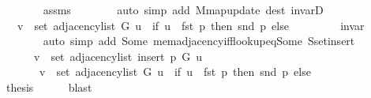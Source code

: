 \begin{isabellebody}
\ \ \ \ \ \ \isamarkupfalse%
\ assms\isanewline
\ \ \ \ \ \ \isamarkupfalse%
\ {\isacharparenleft}{\kern0pt}auto\ simp\ add{\isacharcolon}{\kern0pt}\ M{\isachardot}{\kern0pt}map{\isacharunderscore}{\kern0pt}update\ dest{\isacharcolon}{\kern0pt}\ invarD{\isacharparenleft}{\kern0pt}{}{\isacharparenright}{\kern0pt}{\isacharparenright}{\kern0pt}\isanewline
\ \ \ \ \isamarkupfalse%
\ \isamarkupfalse%
\ {\isachardoublequoteopen}{\isachardot}{\kern0pt}{\isachardot}{\kern0pt}{\isachardot}{\kern0pt}\ {\isasymlongleftrightarrow}\ v\ {\isasymin}\ set\ {\isacharparenleft}{\kern0pt}adjacency{\isacharunderscore}{\kern0pt}list\ G\ u{\isacharparenright}{\kern0pt}\ {\isasymunion}\ {\isacharparenleft}{\kern0pt}if\ u\ {\isacharequal}{\kern0pt}\ fst\ p\ then\ {\isacharbraceleft}{\kern0pt}snd\ p{\isacharbraceright}{\kern0pt}\ else\ {\isacharbraceleft}{\kern0pt}{\isacharbraceright}{\kern0pt}{\isacharparenright}{\kern0pt}{\isachardoublequoteclose}\isanewline
\ \ \ \ \ \ \isamarkupfalse%
\ invar\isanewline
\ \ \ \ \ \ \isamarkupfalse%
\ {\isacharparenleft}{\kern0pt}auto\ simp\ add{\isacharcolon}{\kern0pt}\ Some\ mem{\isacharunderscore}{\kern0pt}adjacency{\isacharunderscore}{\kern0pt}iff{\isacharunderscore}{\kern0pt}lookup{\isacharunderscore}{\kern0pt}eq{\isacharunderscore}{\kern0pt}Some\ S{\isachardot}{\kern0pt}set{\isacharunderscore}{\kern0pt}insert{\isacharparenright}{\kern0pt}\isanewline
\ \ \ \ \isamarkupfalse%
\ \isamarkupfalse%
\isanewline
\ \ \ \ \ \ {\isachardoublequoteopen}v\ {\isasymin}\ set\ {\isacharparenleft}{\kern0pt}adjacency{\isacharunderscore}{\kern0pt}list\ {\isacharparenleft}{\kern0pt}insert\ p\ G{\isacharparenright}{\kern0pt}\ u{\isacharparenright}{\kern0pt}\ {\isasymlongleftrightarrow}\isanewline
\ \ \ \ \ \ \ v\ {\isasymin}\ set\ {\isacharparenleft}{\kern0pt}adjacency{\isacharunderscore}{\kern0pt}list\ G\ u{\isacharparenright}{\kern0pt}\ {\isasymunion}\ {\isacharparenleft}{\kern0pt}if\ u\ {\isacharequal}{\kern0pt}\ fst\ p\ then\ {\isacharbraceleft}{\kern0pt}snd\ p{\isacharbraceright}{\kern0pt}\ else\ {\isacharbraceleft}{\kern0pt}{\isacharbraceright}{\kern0pt}{\isacharparenright}{\kern0pt}{\isachardoublequoteclose}\isanewline
\ \ \ \ \ \ \isacommand{{\isachardot}{\kern0pt}}\isamarkupfalse%
\ \isacommand{{\isacharbraceright}{\kern0pt}}\isamarkupfalse%
\isanewline
\ \ \isamarkupfalse%
\ {\isacharquery}{\kern0pt}thesis\isanewline
\ \ \ \ \isamarkupfalse%
\ blast\isanewline
{}\isamarkupfalse%

\end{isabellebody}
